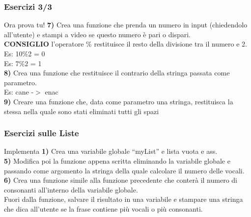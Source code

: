 \documentclass{beamer}
\begin{document}
\begin{frame}[fragile]
\frametitle{Esercizi 3/3}
\begin{block}{Ora prova tu!}
	\textbf{7)}  Crea una funzione che prenda un numero in input (chiedendolo all'utente) e stampi a video se questo numero è pari o dispari.\\
	\textbf{CONSIGLIO} l'operatore \% restituisce il resto della divisione tra il numero e 2.\\
	Es: 10\%2 = 0\\
	Es: 7\%2 = 1\\
	\textbf{8)} Crea una funzione che restituisce il contrario della stringa passata come parametro.\\
	Es: cane -$>$ enac\\
	\textbf{9)} Creare una funzione che, data come parametro una stringa, restituisca la stessa nella quale sono stati eliminati tutti gli spazi\\
\end{block}
\end{frame}


\begin{frame}[fragile]
\frametitle{Esercizi sulle Liste}
\begin{block}{Implementa}
	\textbf{1)} Crea una variabile globale ``myList'' e \texitinizializzala  lista vuota e ass.\\

	\textbf{5)} Modifica poi la funzione appena scritta eliminando la variabile globale e passando come argomento la stringa della quale calcolare il numero delle vocali.\\
	\textbf{6)} Crea una funzione simile alla funzione precedente che conterà il numero di consonanti all'interno della variabile globale.\\
	Fuori dalla funzione, salvare il risultato in una variabile e stampare una stringa che dica all'utente se la frase contiene più vocali o più consonanti.\\
\end{block}
\end{frame}
\end{document}
